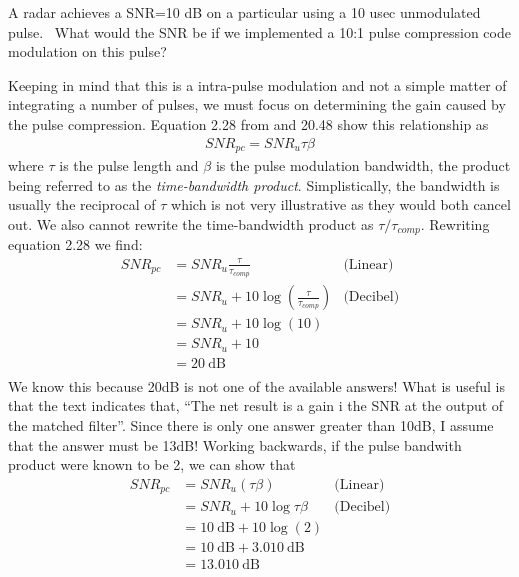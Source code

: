 \documentclass[12pt]{article}
\newcommand\SNR{\mathit{SNR}} %
\newenvironment{exercise}[2][Exercise]{\begin{trivlist}
    \item[\hskip \labelsep {\bfseries #1}\hskip \labelsep {\bfseries #2.}]}{\end{trivlist}}
\begin{document}
      \begin{exercise}{14}
      A radar achieves a SNR=10 dB on a particular using a 10 usec unmodulated pulse.  What would the SNR be if we implemented a 10:1 pulse compression code modulation on this pulse?  

      Keeping in mind that this is a intra-pulse modulation and not a simple matter of integrating a number of pulses, we must focus on determining the gain caused by the pulse compression. Equation 2.28 from \cite[p.~74]{POMR} and 20.48 \cite[p.~788]{POMR} show this relationship as
      \begin{align*}
      \SNR_{pc} = \SNR_{u} \tau \beta
      \end{align*}
      where $\tau$ is the pulse length and $\beta$ is the pulse modulation bandwidth, the product being referred to as the \emph{time-bandwidth product}. Simplistically, the bandwidth is usually the reciprocal of $\tau$ which is not very illustrative as they would both cancel out. We also cannot rewrite the time-bandwidth product as $\tau / \tau_{comp}$. Rewriting equation 2.28 we find:
      \begin{align*}
      \SNR_{pc} & = \SNR_{u} \frac{\tau}{\tau_{comp}}  & \text{(Linear)} \\
      &= \SNR_{u} + 10 \log { (\frac{\tau}{\tau_{comp}}) } & \text{(Decibel)}\\
      &= \SNR_{u} + 10 \log { (10) }\\
      &= \SNR_{u} + 10\\
      &= \SI{20}{\dB}\\
      \end{align*}  
      We know this because 20dB is not one of the available answers!  What is useful is that the text indicates that, ``The net result is a gain i the SNR at the output of the matched filter\cite[p.~788]{POMR}''. Since there is only one answer greater than 10dB, I assume that the answer must be 13dB!  Working backwards, if the pulse bandwith product were known to be 2, we can show that
      \begin{align*}
      \SNR_{pc} & = \SNR_{u} (\tau \beta) & \text{(Linear)}\\
      &= \SNR_{u} + 10 \log {\tau \beta } & \text{(Decibel)}\\
      &= \SI{10}{\dB} + 10 \log { (2) }\\
      &= \SI{10}{\dB} + \SI{3.010}{\dB}\\
      &= \SI{13.010}{\dB}\\
      \end{align*}

      \end{exercise}
      
\end{document}
